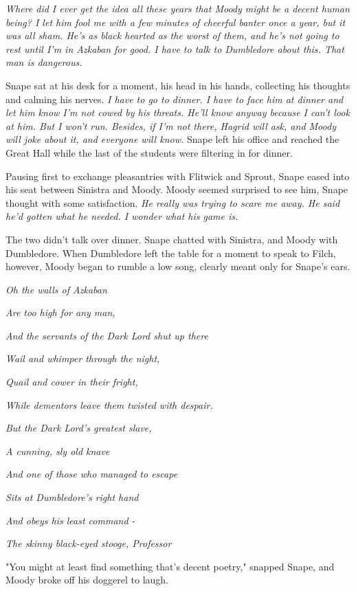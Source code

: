 \emph{Where did I ever get the idea all these years that Moody might be a decent human being? I let him fool me with a few minutes of cheerful banter once a year, but it was all sham. He's as black hearted as the worst of them, and he's not going to rest until I'm in Azkaban for good. I have to talk to Dumbledore about this. That man is dangerous.}

Snape sat at his desk for a moment, his head in his hands, collecting his thoughts and calming his nerves. \emph{I have to go to dinner. I have to face him at dinner and let him know I'm not cowed by his threats. He'll know anyway because I can't look at him. But I won't run. Besides, if I'm not there, Hagrid will ask, and Moody will joke about it, and everyone will know.} Snape left his office and reached the Great Hall while the last of the students were filtering in for dinner.

Pausing first to exchange pleasantries with Flitwick and Sprout, Snape eased into his seat between Sinistra and Moody. Moody seemed surprised to see him, Snape thought with some satisfaction. \emph{He really was trying to scare me away. He said he'd gotten what he needed. I wonder what his game is.}

The two didn't talk over dinner. Snape chatted with Sinistra, and Moody with Dumbledore. When Dumbledore left the table for a moment to speak to Filch, however, Moody began to rumble a low song, clearly meant only for Snape's ears.

\emph{Oh the walls of Azkaban}

\emph{Are too high for any man,}

\emph{And the servants of the Dark Lord shut up there}

\emph{Wail and whimper through the night,}

\emph{Quail and cower in their fright,}

\emph{While dementors leave them twisted with despair.}

\emph{But the Dark Lord's greatest slave,}

\emph{A cunning, sly old knave}

\emph{And one of those who managed to escape}

\emph{Sits at Dumbledore's right hand}

\emph{And obeys his least command -}

\emph{The skinny black-eyed stooge, Professor{\el}}

"You might at least find something that's decent poetry," snapped Snape, and Moody broke off his doggerel to laugh.

